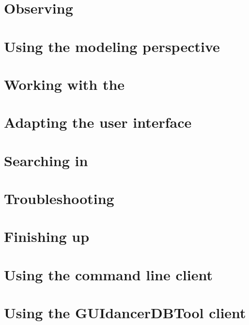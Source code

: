 \clearpage

\section{Observing \gdcases} 


\clearpage

\section{Using the modeling perspective}

\clearpage 

\section{Working with the \gdprobview}


\clearpage

\section{Adapting the user interface}

\clearpage
\section{Searching in \app{}}

\clearpage

\section{Troubleshooting}


\clearpage

\section{Finishing up}


\clearpage

\section{Using the command line client}


\section{Using the GUIdancerDBTool client}
\label{DBTool}


